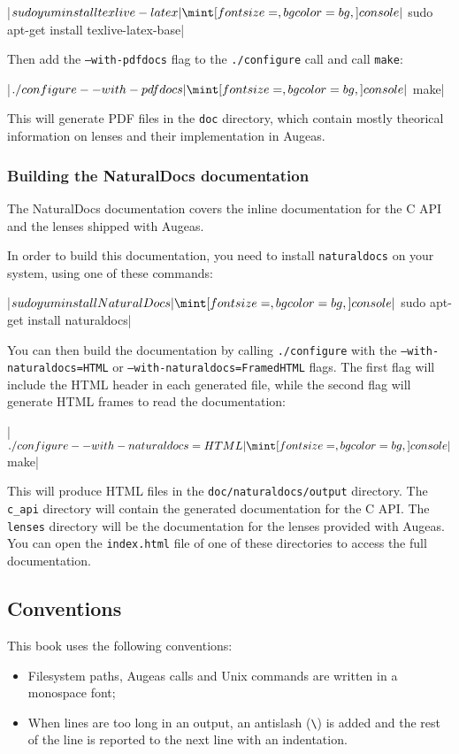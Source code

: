 \consolecode|$ sudo yum install texlive-latex|
\consolecode|$ sudo apt-get install texlive-latex-base|

Then add the \texttt{--with\allowbreak-pdfdocs} flag to the \texttt{./configure} call and call \texttt{make}:

\consolecode|$ ./configure --with-pdfdocs|
\consolecode|$ make|

This will generate PDF files in the \verb!doc! directory, which contain mostly theorical information on lenses and their implementation in Augeas.


\subsubsection{Building the NaturalDocs documentation}

The NaturalDocs documentation covers the inline documentation for the C API and the lenses shipped with Augeas.


In order to build this documentation, you need to install \verb!naturaldocs! on your system, using one of these commands:

\consolecode|$ sudo yum install NaturalDocs|
\consolecode|$ sudo apt-get install naturaldocs|

You can then build the documentation by calling \texttt{./configure} with the \texttt{--with\allowbreak-naturaldocs=HTML} or \texttt{--with\allowbreak-naturaldocs=FramedHTML} flags. The first flag will include the HTML header in each generated file, while the second flag will generate HTML frames to read the documentation:

\consolecode|$ ./configure --with-naturaldocs=HTML|
\consolecode|$ make|

This will produce HTML files in the \verb!doc/naturaldocs/output! directory. The \verb!c_api! directory will contain the generated documentation for the C API. The \verb!lenses! directory will be the documentation for the lenses provided with Augeas. You can open the \verb!index.html! file of one of these directories to access the full documentation.


\subsection{Conventions}

This book uses the following conventions:
\begin{itemize}
  \item
    Filesystem paths, Augeas calls and Unix commands are written in a monospace font;
  \item
    When lines are too long in an output, an antislash (\verb!\!) is added and the rest of the line is reported to the next line with an indentation.
\end{itemize}



